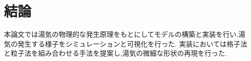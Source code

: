 \chapter{結論}

本論文では湯気の物理的な発生原理をもとにしてモデルの構築と実装を行い,湯気の発生する様子をシミュレーションと可視化を行った.
実装においては格子法と粒子法を組み合わせる手法を提案し,湯気の微細な形状の再現を行った.
